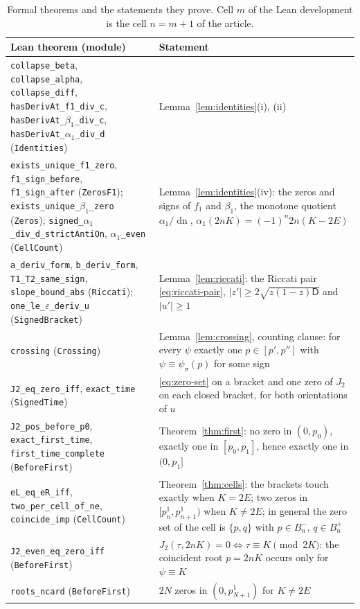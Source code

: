 \documentclass[11pt]{article}
\theoremstyle{remark}
\newcommand{\dn}{\operatorname{dn}}
\begin{document}
\begin{table}[H]
\small\centering
\caption{Formal theorems and the statements they prove.  Cell $m$ of the
Lean development is the cell $n=m+1$ of the article.}
\label{tab:lean-thm}
\begin{tabular}{>{\raggedright\arraybackslash}p{}>{\raggedright\arraybackslash}p{}}
\hline
Lean theorem (module) & Statement\\
\hline
\texttt{collapse\_beta}, \texttt{collapse\_alpha}, \texttt{collapse\_diff}, \texttt{hasDerivAt\_f1\_div\_c}, \texttt{hasDerivAt\_}$\beta_1$\texttt{\_div\_c}, \texttt{hasDerivAt\_}$\alpha_1$\texttt{\_div\_d} (\texttt{Identities}) & Lemma~\ref{lem:identities}(i), (ii)\\
\texttt{exists\_unique\_f1\_zero}, \texttt{f1\_sign\_before}, \texttt{f1\_sign\_after} (\texttt{ZerosF1}); \texttt{exists\_unique\_}$\beta_1$\texttt{\_zero} (\texttt{Zeros}); \texttt{signed\_}$\alpha_1$\texttt{\_div\_d\_strictAntiOn}, $\alpha_1$\texttt{\_even} (\texttt{CellCount}) & Lemma~\ref{lem:identities}(iv): the zeros and signs of $f_1$ and $\beta_1$, the monotone quotient $\alpha_1/\dn$, $\alpha_1(2nK)=(-1)^n2n(K-2E)$\\
\texttt{a\_deriv\_form}, \texttt{b\_deriv\_form}, \texttt{T1\_T2\_same\_sign}, \texttt{slope\_bound\_abs} (\texttt{Riccati}); \texttt{one\_le\_}$\varepsilon$\texttt{\_deriv\_u} (\texttt{SignedBracket}) & Lemma~\ref{lem:riccati}: the Riccati pair \eqref{eq:riccati-pair}, $|z'|\ge2\sqrt{z(1-z)\mathsf D}$ and $|u'|\ge1$\\
\texttt{crossing} (\texttt{Crossing}) & Lemma~\ref{lem:crossing}, counting clause: for every $\psi$ exactly one $p\in[p',p'']$ with $\psi\equiv\psi_\sigma(p)$ for some sign\\
\texttt{J2\_eq\_zero\_iff}, \texttt{exact\_time} (\texttt{SignedTime}) & \eqref{eq:zero-set} on a bracket and one zero of $J_2$ on each closed bracket, for both orientations of $u$\\
\texttt{J2\_pos\_before\_p0}, \texttt{exact\_first\_time}, \texttt{first\_time\_complete} (\texttt{BeforeFirst}) & Theorem~\ref{thm:first}: no zero in $(0,p_0)$, exactly one in $[p_0,p_1]$, hence exactly one in $(0,p_1]$\\
\texttt{eL\_eq\_eR\_iff}, \texttt{two\_per\_cell\_of\_ne}, \texttt{coincide\_imp} (\texttt{CellCount}) & Theorem~\ref{thm:cells}: the brackets touch exactly when $K=2E$; two zeros in $[p_n^1,p_{n+1}^1)$ when $K\ne2E$; in general the zero set of the cell is $\{p,q\}$ with $p\in B_n^-$, $q\in B_n^+$\\
\texttt{J2\_even\_eq\_zero\_iff} (\texttt{BeforeFirst}) & $J_2(\tau,2nK)=0\iff\tau\equiv K\pmod{2K}$: the coincident root $p=2nK$ occurs only for $\psi\equiv K$\\
\texttt{roots\_ncard} (\texttt{BeforeFirst}) & $2N$ zeros in $(0,p_{N+1}^1)$ for $K\ne2E$\\
\hline
\end{tabular}
\end{table}
\end{document}
